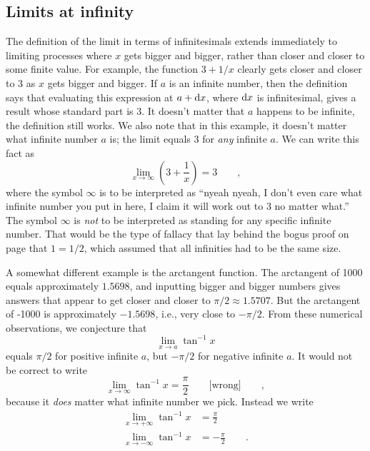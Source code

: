 \subsection{Limits at infinity}

The definition of the limit in terms of infinitesimals extends immediately to limiting
processes where $x$ gets bigger and bigger, rather than closer and closer to some
finite value. For example, the function $3+1/x$ clearly gets closer and closer to
3 as $x$ gets bigger and bigger. If $a$ is an infinite number, then the definition
says that evaluating this expression at $a+\textup{d} x$, where $\textup{d} x$ is infinitesimal,
gives a result whose standard part is 3. It doesn't matter that $a$ happens to be
infinite, the definition still works. We also note that in this example, it doesn't
matter what infinite number $a$ is; the limit equals 3 for \emph{any} infinite $a$.
We can write this fact as
\begin{equation*}
   \lim_{x\rightarrow \infty} \left(3+\frac{1}{x}\right) =3 \qquad ,
\end{equation*}
where the symbol $\infty$ is to be interpreted as ``nyeah nyeah, I don't even care
what infinite number you put in here, I claim it will work out to 3 no matter what.''
The symbol $\infty$ is \emph{not} to be interpreted as standing for any specific
infinite number. That would be the type of fallacy that lay behind the bogus proof
on page \pageref{bogus-proof} that $1=1/2$, which assumed that all infinities had to be
the same size.

A somewhat different example is the arctangent function. The arctangent of 1000 equals
approximately $1.5698$, and inputting bigger and bigger numbers gives answers that appear
to get closer and closer to $\pi/2\approx1.5707$. But the arctangent
of -1000 is approximately $-1.5698$, i.e., very close to $-\pi/2$.
From these numerical
observations, we conjecture that
\begin{equation*}
   \lim_{x\rightarrow a} \tan^{-1} x
\end{equation*}
equals $\pi/2$ for positive infinite $a$, but $-\pi/2$ for negative infinite $a$.
It would not be correct to write
\begin{equation*}
   \lim_{x\rightarrow \infty} \tan^{-1} x = \frac{\pi}{2} \qquad \text{[wrong]} \qquad ,
\end{equation*}
because it \emph{does} matter what infinite number we pick. Instead we write
\begin{align*}
   \lim_{x\rightarrow +\infty} \tan^{-1} x &= \frac{\pi}{2} \\
   \lim_{x\rightarrow -\infty} \tan^{-1} x &= -\frac{\pi}{2} \qquad .
\end{align*}

